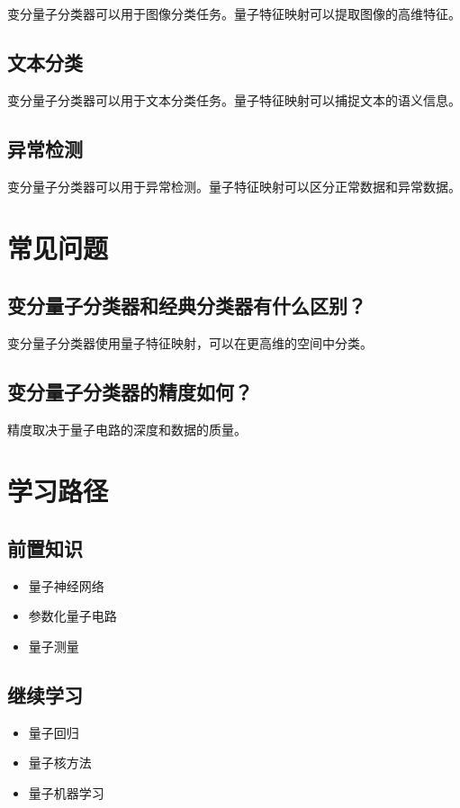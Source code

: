 \documentclass[12pt,a4paper]{article}
\begin{document}
变分量子分类器可以用于图像分类任务。量子特征映射可以提取图像的高维特征。

\subsection{文本分类}

变分量子分类器可以用于文本分类任务。量子特征映射可以捕捉文本的语义信息。

\subsection{异常检测}

变分量子分类器可以用于异常检测。量子特征映射可以区分正常数据和异常数据。

\section{常见问题}

\subsection{变分量子分类器和经典分类器有什么区别？}

变分量子分类器使用量子特征映射，可以在更高维的空间中分类。

\subsection{变分量子分类器的精度如何？}

精度取决于量子电路的深度和数据的质量。

\section{学习路径}

\subsection{前置知识}
\begin{itemize}
  \item 量子神经网络
  \item 参数化量子电路
  \item 量子测量
\end{itemize}

\subsection{继续学习}
\begin{itemize}
  \item 量子回归
  \item 量子核方法
  \item 量子机器学习
\end{itemize}
\end{document}
